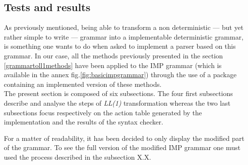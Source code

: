 \documentclass[a4paper,11pt]{article}
\begin{document}
  \subsection{Tests and results}
    \label{sec:results}
    As previously mentioned, being able to transform a non deterministic --- but yet rather simple to write --- grammar into a implementable deterministic grammar, is something one wants to do when asked to implement a parser based on this grammar. In our case, all the methods previously presented in the section \ref{grammartoll1methods} have been applied to the IMP grammar (which is available in the annex fig.\ref{fig:basicimpgrammar}) through the use of a package containing an implemented version of these methods.\\
    The present section is composed of six subsections. The four first subsections describe and analyse the steps of \textit{LL(1)} transformation whereas the two last subsections focus respectively on the action table generated by the implementation and the results of the syntax checker.\\
    \begin{tcolorbox}
      For a matter of readability, it has been decided to only display the modified part of the grammar. To see the full version of the modified IMP grammar one must used the process described in the subsection X.X.
    \end{tcolorbox}
    
\end{document}
